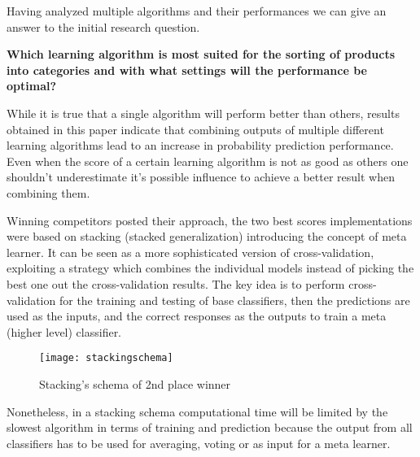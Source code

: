 Having analyzed multiple algorithms and their performances we can give an answer to the initial research question.
\begin{center}
	\textbf{Which learning algorithm is most suited for the sorting of products into categories and with what settings will the performance be optimal?}
\end{center}
While it is true that a single algorithm will perform better than others, results obtained in this paper indicate that combining outputs of multiple different learning algorithms lead to an increase in probability prediction performance. Even when the score of a certain learning algorithm is not as good as others one shouldn't underestimate it's possible influence to achieve a better result when combining them.

Winning competitors posted their approach, the two best scores implementations were based on stacking (stacked generalization) introducing the concept of meta learner. It can be seen as a more sophisticated version of cross-validation, exploiting a strategy which combines the individual models instead of picking the best one out the cross-validation results. The key idea is to perform cross-validation for the training and testing of base classifiers, then the predictions are used as the inputs, and the correct responses as the outputs to train a meta (higher level) classifier.

\begin{figure}[h]
	\centering
	\texttt{[image: stackingschema]}
	\caption{Stacking's schema of 2nd place winner}
	\label{fig:stacking}
\end{figure}
Nonetheless, in a stacking schema computational time will be limited by the slowest algorithm in terms of training and prediction because the output from all classifiers has to be used for averaging, voting or as input for a meta learner.

